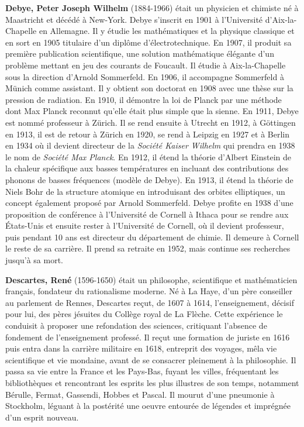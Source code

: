 \textbf{Debye, Peter Joseph Wilhelm} (1884-1966) était un physicien et chimiste né à Maastricht et décédé à New-York. Debye s'inscrit en 1901 à l'Université d'Aix-la-Chapelle en Allemagne. Il y étudie les mathématiques et la physique classique et en sort en 1905 titulaire d'un diplôme d'électrotechnique. En 1907, il produit sa première publication scientifique, une solution mathématique élégante d'un problème mettant en jeu des courants de Foucault. Il étudie à Aix-la-Chapelle sous la direction d'Arnold Sommerfeld. En 1906, il accompagne Sommerfeld à Münich comme assistant. Il y obtient son doctorat en 1908 avec une thèse sur la pression de radiation. En 1910, il démontre la loi de Planck par une méthode dont Max Planck reconnut qu'elle était plus simple que la sienne. En 1911, Debye est nommé professeur à Zürich. Il se rend ensuite à Utrecht en 1912, à Göttingen en 1913, il est de retour à Zürich en 1920, se rend à Leipzig en 1927 et à Berlin en 1934 où il devient directeur de la \textit{Société Kaiser Wilhelm} qui prendra en 1938 le nom de \textit{Société Max Planck}. En 1912, il étend la théorie d'Albert Einstein de la chaleur spécifique aux basses températures en incluant des contributions des phonons de basses fréquences (modèle de Debye). En 1913, il étend la théorie de Niels Bohr de la structure atomique en introduisant des orbites elliptiques, un concept également proposé par Arnold Sommerfeld. Debye profite en 1938 d'une proposition de conférence à l'Université de Cornell à Ithaca pour se rendre aux États-Unis et ensuite rester à l'Université de Cornell, où il devient professeur, puis pendant 10 ans est directeur du département de chimie. Il demeure à Cornell le reste de sa carrière. Il prend sa retraite en 1952, mais continue ses recherches jusqu'à sa mort.

\textbf{Descartes, René} (1596-1650) était un philosophe, scientifique et mathématicien français, fondateur du rationalisme moderne. Né à La Haye, d'un père conseiller au parlement de Rennes, Descartes reçut, de 1607 à 1614, l'enseignement, décisif pour lui, des pères jésuites du Collège royal de La Flèche. Cette expérience le conduisit à proposer une refondation des sciences, critiquant l'absence de fondement de l'enseignement professé. Il reçut une formation de juriste en 1616 puis entra dans la carrière militaire en 1618, entreprit des voyages, mêla vie scientifique et vie mondaine, avant de se consacrer pleinement à la philosophie. Il passa sa vie entre la France et les Pays-Bas, fuyant les villes, fréquentant les bibliothèques et rencontrant les esprits les plus illustres de son temps, notamment Bérulle, Fermat, Gassendi, Hobbes et Pascal. Il mourut d'une pneumonie à Stockholm, léguant à la postérité une oeuvre entourée de légendes et imprégnée d'un esprit nouveau.

